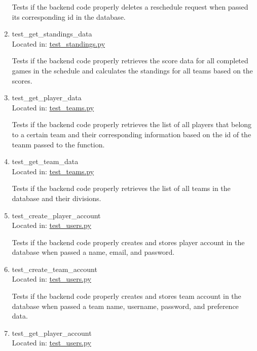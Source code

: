 \documentclass[12pt, titlepage]{article}
\begin{document}
\begin{enumerate}
  Tests if the backend code properly deletes a reschedule request when passed its 
  corresponding id in the database.

  \item{test\_get\_standings\_data\\}
  Located in: \href{https://github.com/Nicholas-Fabugais-Inaba/Sandlot/blob/pytest-workflow/test/test_standings.py}{test\_standings.py}
  
  Tests if the backend code properly retrieves the score data for all completed games
  in the schedule and calculates the standings for all teams based on the scores.
  
  \item{test\_get\_player\_data\\}
  Located in: \href{https://github.com/Nicholas-Fabugais-Inaba/Sandlot/blob/pytest-workflow/test/test_teams.py}{test\_teams.py}
  
  Tests if the backend code properly retrieves the list of all players that belong to a 
  certain team and their corresponding information based on the id of the teanm passed to
  the function.

  \item{test\_get\_team\_data\\}
  Located in: \href{https://github.com/Nicholas-Fabugais-Inaba/Sandlot/blob/pytest-workflow/test/test_teams.py}{test\_teams.py}
  
  Tests if the backend code properly retrieves the list of all teams in the database and 
  their divisions.

  \item{test\_create\_player\_account\\}
  Located in: \href{https://github.com/Nicholas-Fabugais-Inaba/Sandlot/blob/pytest-workflow/test/test_users.py}{test\_users.py}
  
  Tests if the backend code properly creates and stores player account in the database 
  when passed a name, email, and password.

  \item{test\_create\_team\_account\\}
  Located in: \href{https://github.com/Nicholas-Fabugais-Inaba/Sandlot/blob/pytest-workflow/test/test_users.py}{test\_users.py}
  
  Tests if the backend code properly creates and stores team account in the database 
  when passed a team name, username, password, and preference data.

  \item{test\_get\_player\_account\\}
  Located in: \href{https://github.com/Nicholas-Fabugais-Inaba/Sandlot/blob/pytest-workflow/test/test_users.py}{test\_users.py}
  

\end{enumerate}
\end{document}
